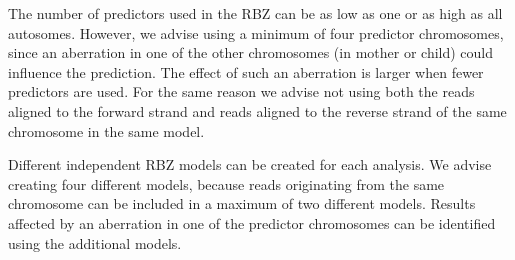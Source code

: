 The number of predictors used in the RBZ can be as low as one or as high as all autosomes. 
However, we advise using a minimum of four predictor chromosomes, since an aberration in one of the other chromosomes (in mother or child) could influence the prediction. 
The effect of such an aberration is larger when fewer predictors are used. 
For the same reason we advise not using both the reads aligned to the forward strand and reads aligned to the reverse strand of the same chromosome in the same model.

Different independent RBZ models can be created for each analysis. 
We advise creating four different models, because reads originating from the same chromosome can be included in a maximum of two different models. Results affected by an aberration in one of the predictor chromosomes can be identified using the additional models.